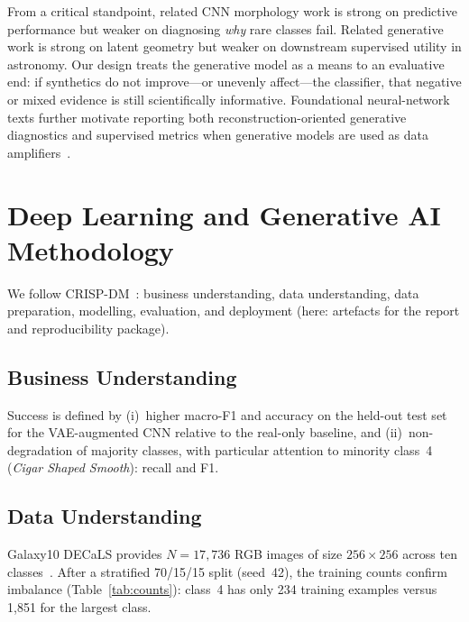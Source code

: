 \documentclass[conference]{IEEEtran}
\begin{document}
From a critical standpoint, related CNN morphology work is strong on predictive performance but weaker on diagnosing \emph{why} rare classes fail. Related generative work is strong on latent geometry but weaker on downstream supervised utility in astronomy. Our design treats the generative model as a means to an evaluative end: if synthetics do not improve---or unevenly affect---the classifier, that negative or mixed evidence is still scientifically informative. Foundational neural-network texts further motivate reporting both reconstruction-oriented generative diagnostics and supervised metrics when generative models are used as data amplifiers~\cite{goodfellow2016dl,aggarwal2018neural,hope2017tensorflow}.

\section{Deep Learning and Generative AI Methodology}
\label{sec:method}
We follow CRISP-DM~\cite{chapman2000crisp}: business understanding, data understanding, data preparation, modelling, evaluation, and deployment (here: artefacts for the report and reproducibility package).

\subsection{Business Understanding}
Success is defined by (i)~higher macro-F1 and accuracy on the held-out test set for the VAE-augmented CNN relative to the real-only baseline, and (ii)~non-degradation of majority classes, with particular attention to minority class~4 (\emph{Cigar Shaped Smooth}): recall and F1.

\subsection{Data Understanding}
Galaxy10 DECaLS provides $N=17{,}736$ RGB images of size $256\times256$ across ten classes~\cite{leung2019astronn}. After a stratified 70/15/15 split (seed~42), the training counts confirm imbalance (Table~\ref{tab:counts}): class~4 has only 234 training examples versus 1{,}851 for the largest class.
\end{document}
